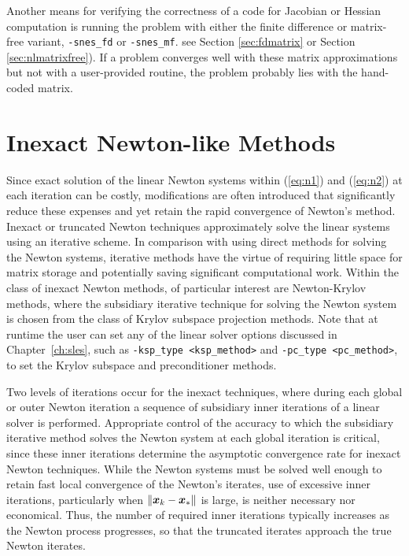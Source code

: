 Another means for verifying the correctness of a code for Jacobian or
Hessian computation is running the problem with either the finite
difference or matrix-free variant, {\tt -snes\_fd} or {\tt -snes\_mf}.
see Section \ref{sec:fdmatrix} or Section \ref{sec:nlmatrixfree}). 
If a problem converges well
with these matrix approximations but not with a user-provided routine,
the problem probably lies with the hand-coded
matrix.  

\section{Inexact Newton-like Methods}

Since exact solution of the linear Newton systems within (\ref{eq:n1}) 
and (\ref{eq:n2}) at each iteration can be costly, modifications 
are often introduced that significantly reduce these expenses and 
yet retain the rapid convergence of Newton's method.  Inexact or 
truncated Newton techniques approximately solve the linear systems 
using an iterative scheme.  In comparison with using direct methods 
for solving the Newton systems, iterative methods have the virtue 
of requiring little space for matrix storage and potentially saving 
significant computational work.  Within the class of inexact Newton 
methods, of particular interest are Newton-Krylov methods, where the 
subsidiary iterative technique for solving the Newton system is 
chosen from the class of Krylov subspace projection methods. 
Note that at runtime the user can set any of the linear solver
options discussed in Chapter~\ref{ch:sles}, such as 
{\tt -ksp\_type <ksp\_method>} and {\tt -pc\_type <pc\_method>},
to set the Krylov subspace and preconditioner methods.

Two levels of iterations occur for the inexact techniques, where 
during each global or outer Newton iteration a sequence of 
subsidiary inner iterations of a linear solver is performed.
Appropriate control of the accuracy to which the subsidiary 
iterative method solves the Newton system
at each global iteration is critical, since these 
inner iterations determine the asymptotic convergence rate for 
inexact Newton techniques.
While the Newton systems must be solved well enough to retain
fast local convergence of the Newton's iterates, use of excessive
inner iterations, particularly when $ \| \mbox{\boldmath \(x\)}_k - \mbox{\boldmath \(x\)}_* \| $ is large,
is neither necessary nor economical.
Thus, the number of required inner iterations typically increases
as the Newton process progresses, so that the truncated iterates
approach the true Newton iterates.

